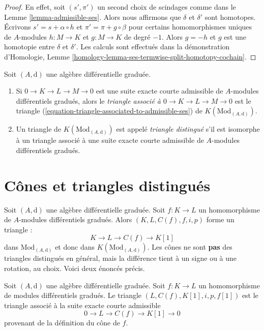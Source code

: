 \begin{proof}
En effet, soit $(s', \pi')$ un second choix de scindages comme dans le Lemme
\ref{lemma-admissible-ses}. Alors nous affirmons que $\delta$ et $\delta'$ sont
homotopes. Écrivons $s' = s + \alpha \circ h$ et $\pi' = \pi + g \circ
\beta$ pour certains homomorphismes uniques de $A$-modules $h : M \to K$ et $g : M
\to K$ de degré $-1$. Alors $g = -h$ et $g$ est une homotopie entre $\delta$ et
$\delta'$. Les calculs sont effectués dans la démonstration d'Homologie, Lemme
\ref{homology-lemma-ses-termwise-split-homotopy-cochain}.
\end{proof}

\begin{definition}
\label{definition-distinguished-triangle}
Soit $(A, \text{d})$ une algèbre différentielle graduée.
\begin{enumerate}
\item Si $0 \to K \to L \to M \to 0$ est une suite exacte courte admissible de
$A$-modules différentiels gradués, alors le {\it triangle associé à $0 \to K \to L
\to M \to 0$} est le triangle
(\ref{equation-triangle-associated-to-admissible-ses}) de $K(\text{Mod}_{(A,
\text{d})})$.
\item Un triangle de $K(\text{Mod}_{(A, \text{d})})$ est appelé {\it triangle
distingué} s'il est isomorphe à un triangle associé à une suite exacte courte
admissible de $A$-modules différentiels gradués.
\end{enumerate}
\end{definition}









\section{Cônes et triangles distingués}
\label{section-cones-and-triangles}

\noindent
Soit $(A, \text{d})$ une algèbre différentielle graduée. Soit $f : K \to L$ un
homomorphisme de $A$-modules différentiels gradués. Alors $(K, L, C(f), f, i, p)$
forme un triangle :
$$
K \to L \to C(f) \to K[1]
$$
dans $\text{Mod}_{(A, \text{d})}$ et donc dans $K(\text{Mod}_{(A, \text{d})})$.
Les cônes ne sont {\bf pas} des triangles distingués en général, mais la différence
tient à un signe ou à une rotation, au choix. Voici deux énoncés précis.

\begin{lemma}
\label{lemma-rotate-cone}
Soit $(A, \text{d})$ une algèbre différentielle graduée. Soit $f : K \to L$ un
homomorphisme de modules différentiels gradués. Le triangle $(L, C(f), K[1], i, p,
f[1])$ est le triangle associé à la suite exacte courte admissible
$$
0 \to L \to C(f) \to K[1] \to 0
$$
provenant de la définition du cône de $f$.
\end{lemma}

